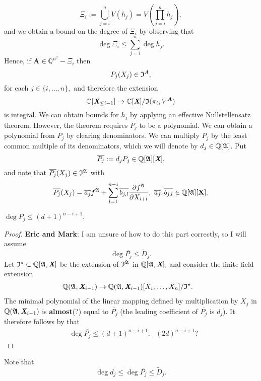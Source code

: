 \documentclass[sigconf]{acmart}
\def\Xb{\textit{\textbf{X}}}
\def\mA{{\bm A}}
\def\ajb{\overline{a_j}}
\def\bjb{\overline{b_{j,l}}}
\def\pjb{\overline{P_{j}}}
\def\Q{\mathbb{Q}}
\def\Dt{\widetilde{D}}
\def\I{\frak{I}}
\def\Is{\frak{I}^{\star}}
\def\A{\frak{A}}
\begin{document}
\[
\Xi_i := \bigcup_{j=i}^n V(h_j) =V\left(\prod_{j=i}^n h_j \right), 
\]
and we obtain a bound on the degree of $\Xi_i$ by observing that
\[
\deg \Xi_i \leq \sum_{j=i}^n \deg h_j.
\]
Hence, if $\mA\in \Q^{n^2}-\Xi_i$ then
\[
P_j(X_j) \in \I^A,  
\]
for each $j \in \{i,\hdots,n\},$ and therefore the extension 
\[
\mathbb{C}[{\Xb}_{\leq i-1}]\rightarrow\mathbb{C}[\Xb]/\I(\pi_i,V^{\mA})
\]
is integral. We can obtain bounds for $h_j$ by applying an effective Nullstellensatz theorem. However, the theorem requires $P_{j}$ to be a polynomial. We can obtain a polynomial from $P_{j}$ by clearing denominators. We can multiply $P_{j}$ by the least common multiple of its denominators, which we will denote by $d_j \in \Q[\A]$. Put 
\[
\overline{P_{j}} := d_jP_{j}\in \Q[\A][\Xb],
\]
and note that $\pjb(X_j) \in \I^{\A}$ with 
\[
\pjb(X_j) = \ajb f^{\A} + \sum_{l=1}^{n-i}\bjb \frac{\partial f^\A}{\partial X_{i+l}}, ~\ajb,\bjb \in \mathbb{Q}[\A][\textbf{X}].
\]
%
\begin{proposition} 
$\deg \pjb\leq (d+1)^{n-i+1}.$ 
\end{proposition} 
%
\begin{proof}
\textbf{Eric and Mark}: I am unsure of how to do this part correctly, so I will assume 
\[
\deg \pjb\leq \Dt_j.
\]
Let $\Is \subset \Q[\A,\Xb]$ be the extension of $\I^{\A}$ in  $\Q[\A,\Xb],$ and consider the finite field extension
%
\begin{align*}
    \Q(\A,\Xb_{i-1}) &\rightarrow \Q(\A,\Xb_{i-1})[X_i,\hdots,X_n]/\Is.
\end{align*}
%
The minimal polynomial of the linear mapping defined by multiplication by $X_j$ in $\Q(\A,\Xb_{i-1})$ is \textbf{almost}(?) equal to $\pjb$ (the leading coefficient of $\pjb$ is $d_j$). It therefore follows by \cite[Proposition 1]{CGR} that
%
\begin{align*}
&\deg \pjb \leq (d+1)^{n-i+1}.&(2d)^{n-i+1}\textrm{?} 
\end{align*}
%
\end{proof}
%
Note that 
\[
\deg d_j \leq \deg \pjb \leq \Dt_j.
\]
%
\end{document}

